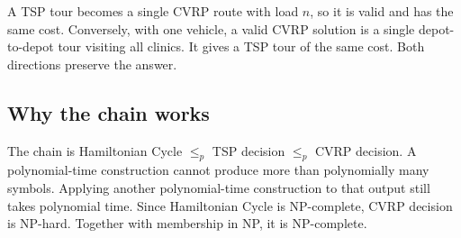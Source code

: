 A TSP tour becomes a single CVRP route with load $n$, so it is valid and has the same cost.
Conversely, with one vehicle, a valid CVRP solution is a single depot-to-depot tour visiting all
clinics. It gives a TSP tour of the same cost. Both directions preserve the answer.

\subsection*{Why the chain works}
The chain is Hamiltonian Cycle $\le_p$ TSP decision $\le_p$ CVRP decision. A polynomial-time
construction cannot produce more than polynomially many symbols. Applying another polynomial-time
construction to that output still takes polynomial time. Since Hamiltonian Cycle is NP-complete,
CVRP decision is NP-hard. Together with membership in NP, it is NP-complete.

